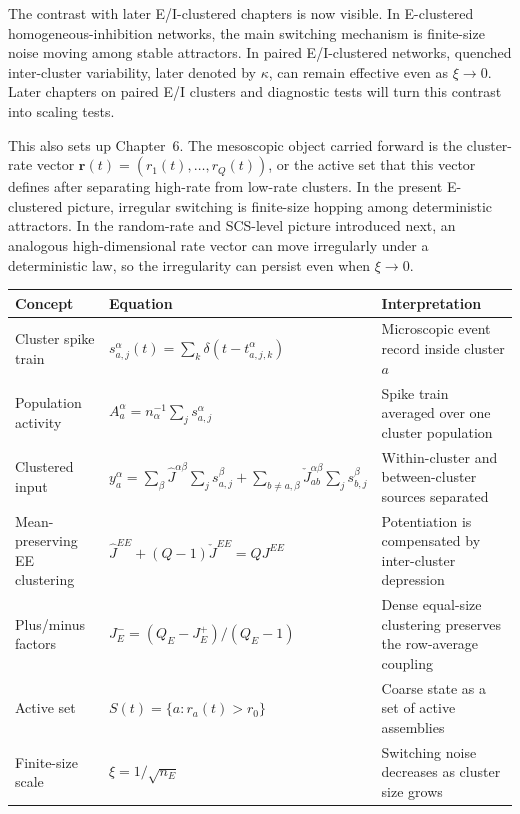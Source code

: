 The contrast with later E/I-clustered chapters is now visible. In E-clustered
homogeneous-inhibition networks, the main switching mechanism is finite-size
noise moving among stable attractors. In paired E/I-clustered networks, quenched
inter-cluster variability, later denoted by $\kappa$, can remain effective even
as $\xi\to 0$. Later chapters on paired E/I clusters and diagnostic tests will
turn this contrast into scaling tests.

This also sets up Chapter~6. The mesoscopic object carried forward is the
cluster-rate vector $\mathbf r(t)=(r_1(t),\ldots,r_Q(t))$, or the active set that
this vector defines after separating high-rate from low-rate clusters. In the
present E-clustered picture, irregular switching is finite-size hopping among
deterministic attractors. In the random-rate and SCS-level picture introduced
next, an analogous high-dimensional rate vector can move irregularly under a
deterministic law, so the irregularity can persist even when $\xi\to0$.

\begin{chaptersummary}
\begin{center}
\renewcommand{\arraystretch}{1.45}
\begin{tabularx}{\textwidth}{@{}l X X@{}}
  \toprule
  \textbf{Concept} & \textbf{Equation} & \textbf{Interpretation} \\
  \midrule
  Cluster spike train &
  $s_{a,j}^{\alpha}(t)=\sum_k\delta(t-t_{a,j,k}^{\alpha})$ &
  Microscopic event record inside cluster $a$ \\
  Population activity &
  $A_a^\alpha=n_\alpha^{-1}\sum_j s_{a,j}^\alpha$ &
  Spike train averaged over one cluster population \\
  Clustered input &
  $y_a^\alpha=\sum_\beta\hat J^{\alpha\beta}\sum_j s_{a,j}^\beta+
  \sum_{b\neq a,\beta}\check J_{ab}^{\alpha\beta}\sum_j s_{b,j}^\beta$ &
  Within-cluster and between-cluster sources separated \\
  Mean-preserving EE clustering &
  $\hat J^{EE}+(Q-1)\check J^{EE}=QJ^{EE}$ &
  Potentiation is compensated by inter-cluster depression \\
  Plus/minus factors &
  $J_E^-=(Q_E-J_E^+)/(Q_E-1)$ &
  Dense equal-size clustering preserves the row-average coupling \\
  Active set &
  $S(t)=\{a:r_a(t)>r_0\}$ &
  Coarse state as a set of active assemblies \\
  Finite-size scale &
  $\xi=1/\sqrt{n_E}$ &
  Switching noise decreases as cluster size grows \\
  \bottomrule
\end{tabularx}
\end{center}
\end{chaptersummary}

